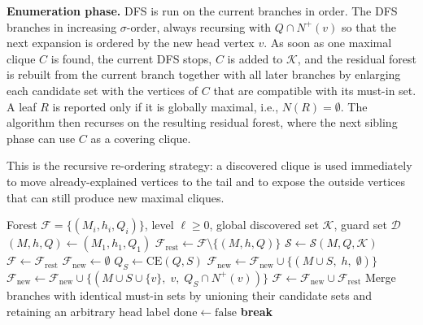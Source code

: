 \documentclass[sigconf, nonacm]{acmart}
\theoremstyle{definition}
\theoremstyle{remark}
\begin{document}
\textbf{Enumeration phase.}  DFS is run on the current branches in order.  The
DFS branches in increasing $\sigma$-order, always recursing with
$Q \cap N^+(v)$ so that the next expansion is ordered by the new head vertex
$v$.  As soon as one maximal clique $C$ is found, the current DFS stops, $C$ is
added to $\mathcal{K}$, and the residual forest is rebuilt from the current
branch together with all later branches by enlarging each candidate set with the
vertices of $C$ that are compatible with its must-in set.  A leaf $R$ is
reported only if it is globally maximal, i.e., $N(R)=\emptyset$.  The algorithm
then recurses on the resulting residual forest, where the next sibling phase can
use $C$ as a covering clique.

This is the recursive re-ordering strategy: a discovered clique is used
immediately to move already-explained vertices to the tail and to expose the
outside vertices that can still produce new maximal cliques.

\begin{algorithm}[t]
\caption{\textsc{rCall}: sibling reduction and enumeration dispatch}
\label{alg:rcall}
\begin{algorithmic}[1]
\Require Forest $\mathcal{F} = \{(M_i,h_i,Q_i)\}$, level $\ell \ge 0$,
         global discovered set $\mathcal{K}$, guard set $\mathcal{D}$
  \State $(M,h,Q) \gets (M_1,h_1,Q_1)$
  \State $\mathcal{F}_{\mathrm{rest}} \gets \mathcal{F} \setminus \{(M,h,Q)\}$
  \State $\mathcal{S} \gets \mathcal{S}(M,Q,\mathcal{K})$
    \State $\mathcal{F} \gets \mathcal{F}_{\mathrm{rest}}$
  \Else
    \State $\mathcal{F}_{\mathrm{new}} \gets \emptyset$
      \State $Q_S \gets \mathrm{CE}(Q,S)$
        \State $\mathcal{F}_{\mathrm{new}} \gets \mathcal{F}_{\mathrm{new}} \cup \{(M \cup S,\; h,\; \emptyset)\}$
      \Else
          \State $\mathcal{F}_{\mathrm{new}} \gets \mathcal{F}_{\mathrm{new}} \cup
                 \{(M \cup S \cup \{v\},\; v,\; Q_S \cap N^+(v))\}$
        \EndFor
      \EndIf
    \EndFor
    \State $\mathcal{F} \gets \mathcal{F}_{\mathrm{new}} \cup \mathcal{F}_{\mathrm{rest}}$
  \EndIf
  \State Merge branches with identical must-in sets by unioning their candidate sets and retaining an arbitrary head label
\EndIf
{}
  \State $\mathrm{done} \gets \mathrm{false}$
  \State {}
   \textbf{break} \EndIf
\EndFor
\end{algorithmic}
\end{algorithm}
\end{document}
